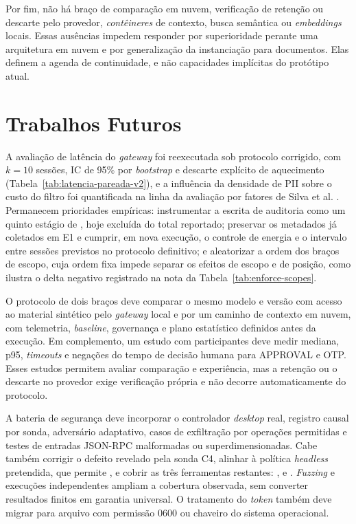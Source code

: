 Por fim, não há braço de comparação em nuvem, verificação de retenção ou descarte pelo provedor, \textit{contêineres} de contexto, busca semântica ou \textit{embeddings} locais. Essas ausências impedem responder por superioridade perante uma arquitetura em nuvem e por generalização da instanciação para documentos. Elas definem a agenda de continuidade, e não capacidades implícitas do protótipo atual.

\section{Trabalhos Futuros}
A avaliação de latência do \textit{gateway} foi reexecutada sob protocolo corrigido, com $k=10$ sessões, IC de 95\% por \textit{bootstrap} e descarte explícito de aquecimento (Tabela~\ref{tab:latencia-pareada-v2}), e a influência da densidade de PII sobre o custo do filtro foi quantificada na linha da avaliação por fatores de Silva et al. \cite{silva2016}. Permanecem prioridades empíricas: instrumentar a escrita de auditoria como um quinto estágio de , hoje excluída do total reportado; preservar os metadados já coletados em E1 e cumprir, em nova execução, o controle de energia e o intervalo entre sessões previstos no protocolo definitivo; e aleatorizar a ordem dos braços de escopo, cuja ordem fixa impede separar os efeitos de escopo e de posição, como ilustra o delta negativo registrado na nota da Tabela~\ref{tab:enforce-scopes}.

O protocolo de dois braços deve comparar o mesmo modelo e versão com acesso ao material sintético pelo \textit{gateway} local e por um caminho de contexto em nuvem, com telemetria, \textit{baseline}, governança e plano estatístico definidos antes da execução. Em complemento, um estudo com participantes deve medir mediana, p95, \textit{timeouts} e negações do tempo de decisão humana para APPROVAL e OTP. Esses estudos permitem avaliar comparação e experiência, mas a retenção ou o descarte no provedor exige verificação própria e não decorre automaticamente do protocolo.

A bateria de segurança deve incorporar o controlador \textit{desktop} real, registro causal por sonda, adversário adaptativo, casos de exfiltração por operações permitidas e testes de entradas JSON-RPC malformadas ou superdimensionadas. Cabe também corrigir o defeito revelado pela sonda C4, alinhar  à política \textit{headless} pretendida, que permite , e cobrir as três ferramentas restantes: ,  e . \textit{Fuzzing} e execuções independentes ampliam a cobertura observada, sem converter resultados finitos em garantia universal. O tratamento do \textit{token} também deve migrar para arquivo com permissão 0600 ou chaveiro do sistema operacional.

